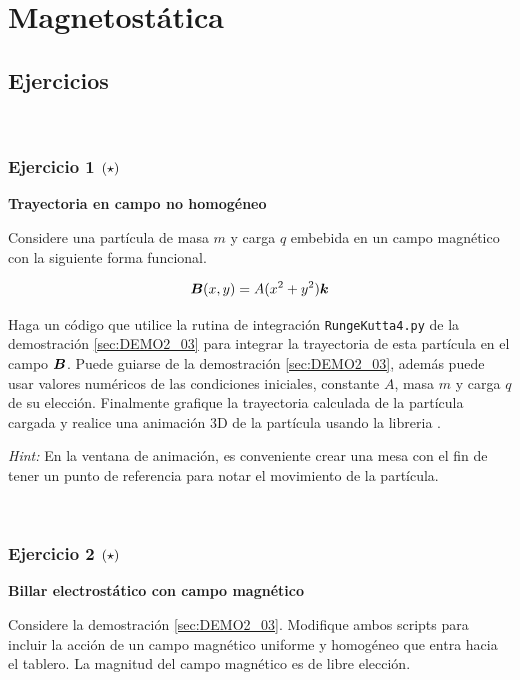\chapter{Magnetostática}
\label{cha:magnetostatic}



\section{Ejercicios}
\label{sec:ejercicios}

\
\subsection*{Ejercicio 1 \large{$\left( \star \right)$}}

\textbf{Trayectoria en campo no homogéneo}

Considere una partícula de masa $m$ y carga $q$ embebida en un campo 
magnético con la siguiente forma funcional.

\[ \boldsymbol{ B }(x, y) = A(x^2+y^2)\boldsymbol{ k } \]

Haga un código que utilice la rutina de integración \texttt{RungeKutta4.py} 
de la demostración \ref{sec:DEMO2_03} para integrar la trayectoria de esta 
partícula en el campo $\boldsymbol{ B }$. Puede guiarse de la demostración 
\ref{sec:DEMO2_03}, además puede usar valores numéricos de las condiciones 
iniciales, constante $A$, masa $m$ y carga $q$ de su elección.
Finalmente grafique la trayectoria calculada de la partícula cargada y 
realice una animación 3D de la partícula usando la libreria \mayavi.

\textit{Hint:} En la ventana de animación, es conveniente crear una mesa 
con el fin de tener un punto de referencia para notar el movimiento de la 
partícula.

\

\subsection*{Ejercicio 2 \large{$\left( \star \right)$}}

\textbf{Billar electrostático con campo magnético}


Considere la demostración \ref{sec:DEMO2_03}. Modifique ambos scripts para
incluir la acción de un campo magnético uniforme y homogéneo que entra hacia
el tablero. La magnitud del campo magnético es de libre elección.


